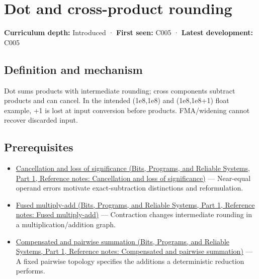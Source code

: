 \hypertarget{appendix-5aef4f13483a}{}\label{referencestart:appendix-5aef4f13483a}
\section{Dot and cross-product rounding}\label{appendix-5aef4f13483a-dot-and-cross-product-rounding}

\hypertarget{appendix-5aef4f13483a-dot-and-cross-product-rounding}{}

\textbf{Curriculum depth:} Introduced · \textbf{First seen:} C005 · \textbf{Latest development:} C005

\begin{allmightroledefinition}

\subsection{Definition and mechanism}\label{appendix-5aef4f13483a-definition-and-mechanism}

\hypertarget{appendix-5aef4f13483a-definition-and-mechanism}{}

Dot sums products with intermediate rounding; cross components subtract products and can cancel. In the intended (1e8,1e8) and (1e8,1e8+1) float example, +1 is lost at input conversion before products. FMA/widening cannot recover discarded input.

\end{allmightroledefinition}

\subsection{Prerequisites}\label{appendix-5aef4f13483a-prerequisites}

\hypertarget{appendix-5aef4f13483a-prerequisites}{}

\begin{itemize}
\tightlist
\item
  \href{../01-Bits-Programs-and-Reliable-Systems-P01/main.pdf\#appendix-a2773a6a2f9d}{Cancellation and loss of significance (Bits, Programs, and Reliable Systems, Part 1, Reference notes: Cancellation and loss of significance)} --- Near-equal operand errors motivate exact-subtraction distinctions and reformulation.
\item
  \href{../01-Bits-Programs-and-Reliable-Systems-P01/main.pdf\#appendix-41e8ef22a21e}{Fused multiply-add (Bits, Programs, and Reliable Systems, Part 1, Reference notes: Fused multiply-add)} --- Contraction changes intermediate rounding in a multiplication/addition graph.
\item
  \href{../01-Bits-Programs-and-Reliable-Systems-P01/main.pdf\#appendix-df318da57389}{Compensated and pairwise summation (Bits, Programs, and Reliable Systems, Part 1, Reference notes: Compensated and pairwise summation)} --- A fixed pairwise topology specifies the additions a deterministic reduction performs.
\end{itemize}

